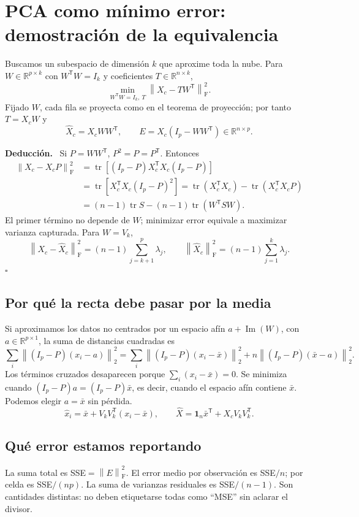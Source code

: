 \documentclass[11pt,a4paper]{article}
\newcommand{\R}{\mathbb R}
\newcommand{\T}{^{\mathsf T}}
\newcommand{\norm}[1]{\left\lVert #1\right\rVert}
\DeclareMathOperator{\tr}{tr}
\newenvironment{deduccion}{\par\textbf{Deducción.}\ }{\hfill$\square$\par}
\DeclareMathOperator{\range}{Im}
\newcommand{\F}{_{\mathrm F}}
\newcommand{\ones}{\mathbf 1}
\theoremstyle{definition}
\begin{document}
\section{PCA como mínimo error: demostración de la equivalencia}
Buscamos un subespacio de dimensión $k$ que aproxime toda la nube. Para $W\in\R^{p\times k}$ con $W\T W=I_k$ y coeficientes $T\in\R^{n\times k}$,
\[
\min_{W\T W=I_k,\ T}\norm{X_c-TW\T}\F^2.
\]
Fijado $W$, cada fila se proyecta como en el teorema de proyección; por tanto $T=X_cW$ y
\[
\widehat X_c=X_cWW\T,\qquad E=X_c(I_p-WW\T)\in\R^{n\times p}.
\]
\begin{deduccion}
Si $P=WW\T$, $P^2=P=P\T$. Entonces
\begin{align*}
\norm{X_c-X_cP}\F^2
&=\tr[(I_p-P)X_c\T X_c(I_p-P)]\\
&=\tr[X_c\T X_c(I_p-P)^2]
=\tr(X_c\T X_c)-\tr(X_c\T X_cP)\\
&=(n-1)\tr S-(n-1)\tr(W\T SW).
\end{align*}
El primer término no depende de $W$; minimizar error equivale a maximizar varianza capturada. Para $W=V_k$,
\[
\boxed{\norm{X_c-\widehat X_c}\F^2=(n-1)\sum_{j=k+1}^p\lambda_j},\qquad
\boxed{\norm{\widehat X_c}\F^2=(n-1)\sum_{j=1}^k\lambda_j}.
\]
\end{deduccion}
\subsection{Por qué la recta debe pasar por la media}
Si aproximamos los datos no centrados por un espacio afín $a+\range(W)$, con $a\in\R^{p\times1}$, la suma de distancias cuadradas es
\[
\sum_i\norm{(I_p-P)(x_i-a)}_2^2
=\sum_i\norm{(I_p-P)(x_i-\bar x)}_2^2+n\norm{(I_p-P)(\bar x-a)}_2^2.
\]
Los términos cruzados desaparecen porque $\sum_i(x_i-\bar x)=0$. Se minimiza cuando $(I_p-P)a=(I_p-P)\bar x$, es decir, cuando el espacio afín contiene $\bar x$. Podemos elegir $a=\bar x$ sin pérdida.
\[
\widehat x_i=\bar x+V_kV_k\T(x_i-\bar x),\qquad
\widehat X=\ones_n\bar x\T+X_cV_kV_k\T.
\]
\subsection{Qué error estamos reportando}
La suma total es SSE$=\norm E\F^2$. El error medio por observación es SSE$/n$; por celda es SSE$/(np)$. La suma de varianzas residuales es SSE$/(n-1)$. Son cantidades distintas: no deben etiquetarse todas como ``MSE'' sin aclarar el divisor.
\end{document}
